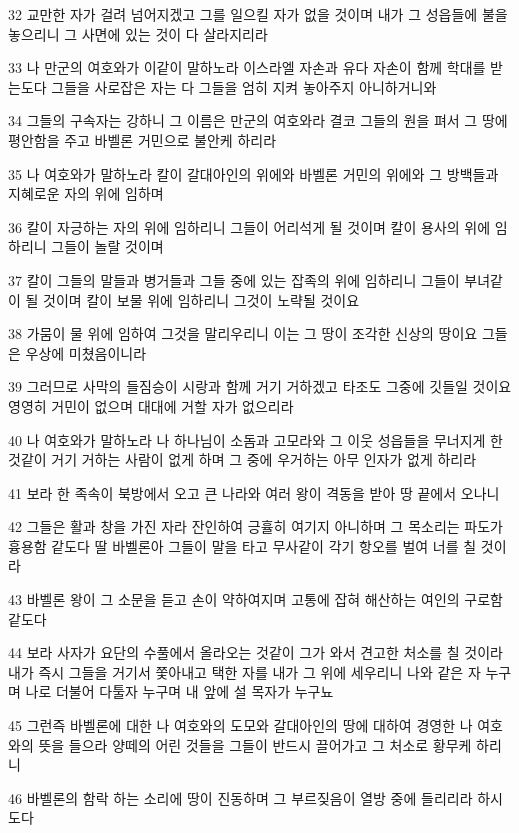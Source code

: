 \par 32 교만한 자가 걸려 넘어지겠고 그를 일으킬 자가 없을 것이며 내가 그 성읍들에 불을 놓으리니 그 사면에 있는 것이 다 살라지리라
\par 33 나 만군의 여호와가 이같이 말하노라 이스라엘 자손과 유다 자손이 함께 학대를 받는도다 그들을 사로잡은 자는 다 그들을 엄히 지켜 놓아주지 아니하거니와
\par 34 그들의 구속자는 강하니 그 이름은 만군의 여호와라 결코 그들의 원을 펴서 그 땅에 평안함을 주고 바벨론 거민으로 불안케 하리라
\par 35 나 여호와가 말하노라 칼이 갈대아인의 위에와 바벨론 거민의 위에와 그 방백들과 지혜로운 자의 위에 임하며
\par 36 칼이 자긍하는 자의 위에 임하리니 그들이 어리석게 될 것이며 칼이 용사의 위에 임하리니 그들이 놀랄 것이며
\par 37 칼이 그들의 말들과 병거들과 그들 중에 있는 잡족의 위에 임하리니 그들이 부녀같이 될 것이며 칼이 보물 위에 임하리니 그것이 노략될 것이요
\par 38 가뭄이 물 위에 임하여 그것을 말리우리니 이는 그 땅이 조각한 신상의 땅이요 그들은 우상에 미쳤음이니라
\par 39 그러므로 사막의 들짐승이 시랑과 함께 거기 거하겠고 타조도 그중에 깃들일 것이요 영영히 거민이 없으며 대대에 거할 자가 없으리라
\par 40 나 여호와가 말하노라 나 하나님이 소돔과 고모라와 그 이웃 성읍들을 무너지게 한 것같이 거기 거하는 사람이 없게 하며 그 중에 우거하는 아무 인자가 없게 하리라
\par 41 보라 한 족속이 북방에서 오고 큰 나라와 여러 왕이 격동을 받아 땅 끝에서 오나니
\par 42 그들은 활과 창을 가진 자라 잔인하여 긍휼히 여기지 아니하며 그 목소리는 파도가 흉용함 같도다 딸 바벨론아 그들이 말을 타고 무사같이 각기 항오를 벌여 너를 칠 것이라
\par 43 바벨론 왕이 그 소문을 듣고 손이 약하여지며 고통에 잡혀 해산하는 여인의 구로함 같도다
\par 44 보라 사자가 요단의 수풀에서 올라오는 것같이 그가 와서 견고한 처소를 칠 것이라 내가 즉시 그들을 거기서 쫓아내고 택한 자를 내가 그 위에 세우리니 나와 같은 자 누구며 나로 더불어 다툴자 누구며 내 앞에 설 목자가 누구뇨
\par 45 그런즉 바벨론에 대한 나 여호와의 도모와 갈대아인의 땅에 대하여 경영한 나 여호와의 뜻을 들으라 양떼의 어린 것들을 그들이 반드시 끌어가고 그 처소로 황무케 하리니
\par 46 바벨론의 함락 하는 소리에 땅이 진동하며 그 부르짖음이 열방 중에 들리리라 하시도다

